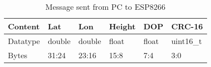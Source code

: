 \begin{table}[H]
\centering

\begin{tabularx}{0.75\textwidth}{@{}|X|X|X|X|X|X|@{}}
\toprule
Content & Lat    & Lon    & Height & DOP   & CRC-16  \\ \midrule
Datatype    & double & double & float  & float & uint16\_t \\ \midrule
Bytes    & 31:24  & 23:16   & 15:8    & 7:4 & 3:0 \\ \bottomrule
\end{tabularx}
\caption{Message sent from PC to ESP8266}
\label{my-label}
\end{table}